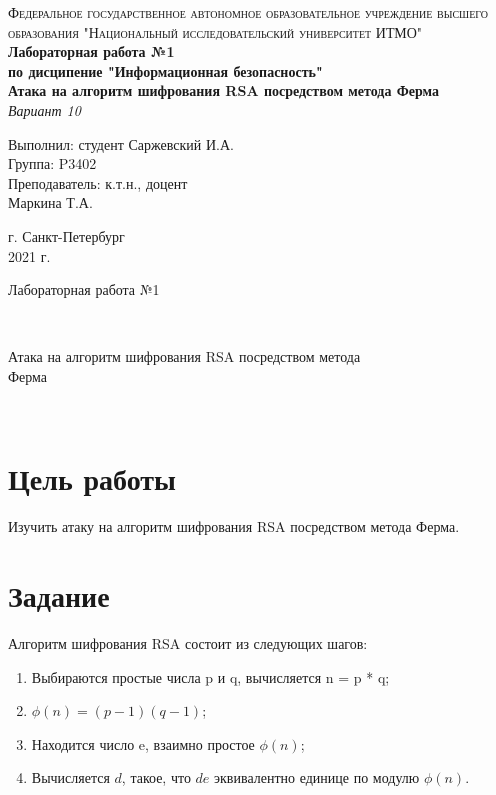 \documentclass[12pt, a4paper]{article}
\begin{document}
\begin{titlepage}
\begin{center}

\textsc{Федеральное государственное автономное образовательное учреждение высшего\\
образования "Национальный исследовательский университет ИТМО"}
\vfill
\textbf{Лабораторная работа №1\\[4mm]
по дисципение "Информационная безопасность"\\[4mm]
Атака на алгоритм шифрования RSA посредством метода Ферма\\[4mm]
}
\textit{Вариант 10\\[20mm]}
\begin{flushright}
Выполнил: студент Саржевский И.А.
\\[2mm]Группа: P3402\\[4mm]
Преподаватель: к.т.н., доцент\\
Маркина Т.А.
\end{flushright}
\vfill
г. Санкт-Петербург\\[2mm]
2021 г.

\end{center}
\end{titlepage}

\begin{huge}Лабораторная работа №1\end{huge}\\[4mm]
\begin{Large}Атака на алгоритм шифрования RSA посредством метода\\Ферма\end{Large}\\

\section*{Цель работы}

Изучить атаку на алгоритм шифрования RSA посредством метода Ферма.

\section*{Задание}

Алгоритм шифрования RSA состоит из следующих шагов:

\begin{enumerate}
  \item Выбираются простые числа p и q, вычисляется n = p * q;
  \item $\phi(n) = (p - 1)(q - 1)$;
  \item Находится число e, взаимно простое $\phi(n)$;
  \item Вычисляется $d$, такое, что $de$ эквивалентно единице по модулю $\phi(n)$.
\end{enumerate}
\end{document}
